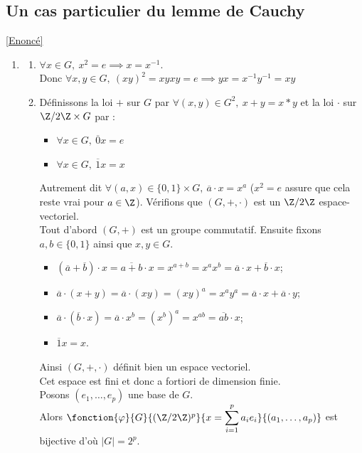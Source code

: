 \documentclass[8pt]{book}
\begin{document}
	\subsection{Un cas particulier du lemme de Cauchy }
	\label{Un cas particulier du lemme de Cauchy corrigé}
	\textcolor{blue}{\hyperref[Un cas particulier du lemme de Cauchy]{[Enoncé]}}\\
	\begin{enumerate}[leftmargin=*]
		\item \begin{enumerate}[label=\alph*.]
			\item $\forall x\in G,\ x^2=e\implies x=x^{-1}$.\\
			Donc $\forall x,y\in G,\ (xy)^2=xyxy=e\implies yx=x^{-1}y^{-1}=xy$
			\item Définissons la loi $+$ sur $G$ par $\forall (x,y)\in G^2,\ x+y=x*y$ et la loi $\cdot$ sur $\Z/2\Z\times G$ par :
			\begin{itemize}
				\item $\forall x\in G,\ \overline{0}x=e$
				\item $\forall x\in G,\ \overline{1}x=x$
			\end{itemize}
			Autrement dit $\forall (a,x)\in \{0,1\}\times G,\ \overline{a}\cdot x=x^a$ ($x^2=e$ assure que cela reste vrai pour $a\in \Z$).
			Vérifions que $(G,+,\cdot)$ est un $\Z/2\Z$ espace-vectoriel.\\
			Tout d'abord $(G,+)$ est un groupe commutatif. Ensuite fixons $a,b\in \{0,1\}$ ainsi que $x,y\in G$.
			\begin{itemize}
				\item $(\overline{a}+\overline{b})\cdot x=\overline{a+b}\cdot x=x^{a+b}=x^ax^b=\overline{a}\cdot x+\overline{b}\cdot x$;
				\item $\overline{a}\cdot(x+y)=\overline{a}\cdot(xy)=(xy)^a=x^ay^a=\overline{a}\cdot x+\overline{a}\cdot y$;
				\item $\overline{a}\cdot(\overline{b}\cdot x)=\overline{a}\cdot x^b=\left(x^b\right)^a=x^{ab}=\overline{ab}\cdot x$;
				\item $\overline{1}x=x$.
			\end{itemize}
			Ainsi $(G,+,\cdot)$ définit bien un espace vectoriel.\\
			Cet espace est fini et donc a fortiori de dimension finie.\\
			Posons $(e_1,\dots,e_p)$ une base de $G$.\\
			Alors $\fonction{\varphi}{G}{(\Z/2\Z)^p}{x=\displaystyle\sum\limits_{i=1}^pa_ie_i}{(a_1,\dots,a_p)}$ est bijective d'où $|G|=2^p$.

\end{enumerate}
\end{enumerate}
\end{document}
